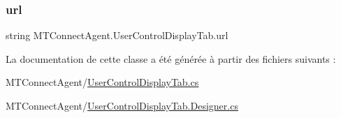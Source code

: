 \subsubsection{\texorpdfstring{url}{url}}
{\footnotesize\ttfamily string M\+T\+Connect\+Agent.\+User\+Control\+Display\+Tab.\+url\hspace{0.3cm}{\ttfamily [private]}}



La documentation de cette classe a été générée à partir des fichiers suivants \+:\begin{DoxyCompactItemize}
\item 
M\+T\+Connect\+Agent/\mbox{\hyperlink{_user_control_display_tab_8cs}{User\+Control\+Display\+Tab.\+cs}}\item 
M\+T\+Connect\+Agent/\mbox{\hyperlink{_user_control_display_tab_8_designer_8cs}{User\+Control\+Display\+Tab.\+Designer.\+cs}}\end{DoxyCompactItemize}
